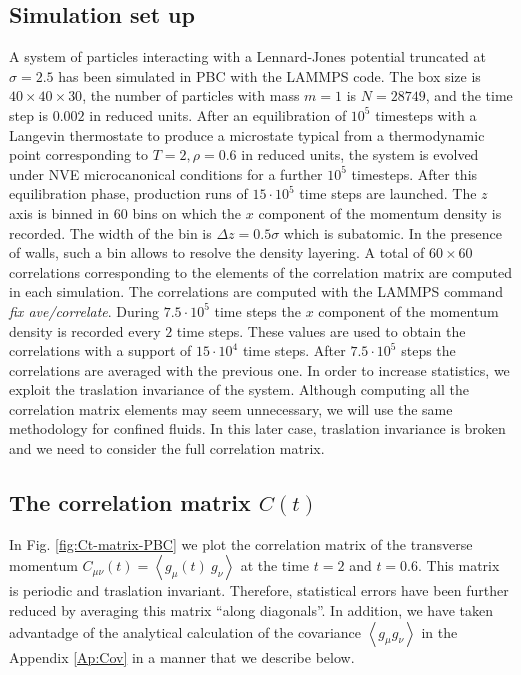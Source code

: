 \documentclass[a4paper,openright,12pt]{book}
\newcommand{\llangle}{\left\langle}
\newcommand{\rrangle}{\right\rangle}
\begin{document}
\subsection{Simulation set up}
A  system  of particles  interacting  with  a Lennard-Jones  potential
truncated at  $\sigma=2.5$ has been  simulated in PBC with  the LAMMPS
code.  The box  size is $40\times40\times30$, the  number of particles with mass $m=1$
is $N=28749$, and the time step is $0.002$ in reduced units.  After an
equilibration  of  $10^5$ timesteps  with  a  Langevin thermostate  to
produce a microstate typical  from a thermodynamic point corresponding
to $T=2,\rho=0.6$ in  reduced units, the system is  evolved under NVE
microcanonical conditions for a  further $10^5$ timesteps.  After this
equilibration  phase,  production  runs   of  $15\cdot 10^5$  time  steps  are
launched.   The $z$  axis is  binned  in $60$  bins on  which the  $x$
component of the momentum density is recorded.  The
width of the  bin is $\Delta z=0.5\sigma$ which is  subatomic.  In the
presence of walls,  such a bin allows to resolve  the density layering.  A total of $60\times  60$ correlations corresponding to the
elements of  the correlation matrix  are computed in  each simulation.
The correlations are computed with the LAMMPS command {\it fix ave/correlate}. During $7.5\cdot 10^5$ time steps the $x$ component of the momentum density is recorded every $2$ time steps. These values are used to obtain the correlations with a support of $15\cdot10^4$ time steps. %
After $7.5\cdot 10^5$ steps the correlations are averaged with the previous one. 
In  order to  increase  statistics,  we 
exploit   the   traslation   invariance   of   the
system.  Although computing  all the  correlation matrix  elements may
seem  unnecessary,  we will  use  the  same methodology  for  confined
fluids. In  this later  case, traslation invariance  is broken  and we
need to consider the full correlation matrix.

\subsection{The correlation matrix $C(t)$}

In  Fig. \ref{fig:Ct-matrix-PBC} we  plot the  correlation  matrix of  the
transverse     momentum      $C_{\mu\nu}(t)=\llangle     g_{\mu}(t)\
g_\nu\rrangle$ at  the time  $t=2$ and $t=0.6$.  This  matrix is  periodic and
traslation invariant.  Therefore, statistical errors have been further
reduced by averaging this matrix ``along diagonals''.  In addition, we
have taken advantadge of the  analytical calculation of the covariance
$\llangle g_{\mu} g_\nu\rrangle$ in the Appendix \ref{Ap:Cov} in a
manner that we describe below.
\end{document}
